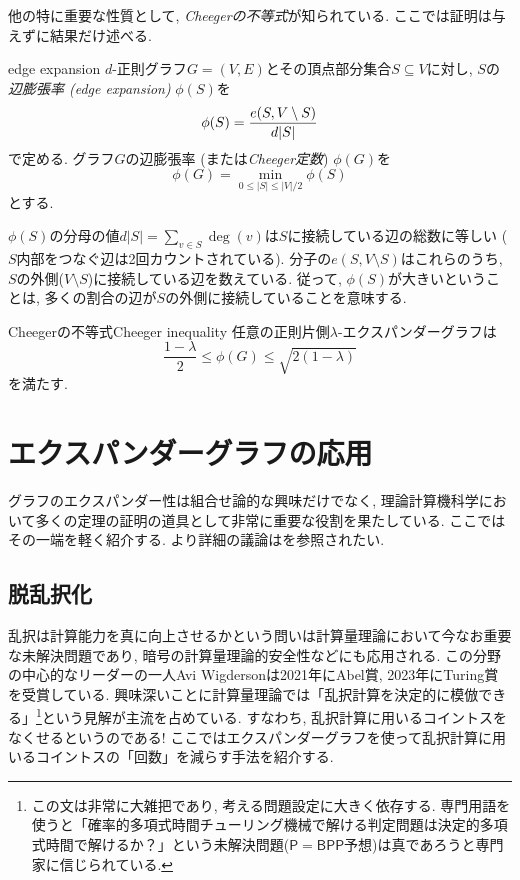 他の特に重要な性質として, \emph{Cheegerの不等式}\cite{Cheeger70}が知られている.
ここでは証明は与えずに結果だけ述べる.
%
\begin{definition}{}{edge expansion}
    $d$-正則グラフ$G=(V,E)$とその頂点部分集合$S\subseteq V$に対し,
    $S$の\emph{辺膨張率 (edge expansion)} $\phi(S)$を
    \[
        \phi(S) = \frac{e(S,V\setminus S)}{d\lvert S\rvert}
    \]
    で定める. グラフ$G$の辺膨張率 (または\emph{Cheeger定数}) $\phi(G)$を
    \[
        \phi(G) = \min_{0 \le |S| \le |V|/2} \phi(S)
    \]
    とする.
\end{definition}
$\phi(S)$の分母の値$d|S|  =\sum_{v\in S}\deg(v)$は$S$に接続している辺の総数に等しい ($S$内部をつなぐ辺は2回カウントされている).
分子の$e(S,V\setminus S)$はこれらのうち, $S$の外側($V\setminus S$)に接続している辺を数えている.
従って, $\phi(S)$が大きいということは, 多くの割合の辺が$S$の外側に接続していることを意味する.
\begin{theorem}{Cheegerの不等式}{Cheeger inequality}
    任意の正則片側$\lambda$-エクスパンダーグラフは
    \[
        \frac{1-\lambda}{2} \le \phi(G) \le \sqrt{2(1-\lambda)}
    \]
    を満たす.
\end{theorem}


\section{エクスパンダーグラフの応用} \label{sec:expander graph application}
グラフのエクスパンダー性は組合せ論的な興味だけでなく,
理論計算機科学において多くの定理の証明の道具として非常に重要な役割を果たしている.
ここではその一端を軽く紹介する.
より詳細の議論は\cite{HLW06}を参照されたい.
%
\subsection{脱乱択化}
乱択は計算能力を真に向上させるかという問いは計算量理論において今なお重要な未解決問題であり,
暗号の計算量理論的安全性などにも応用される.
この分野の中心的なリーダーの一人Avi Wigdersonは2021年にAbel賞, 2023年にTuring賞を受賞している.
興味深いことに計算量理論では「乱択計算を決定的に模倣できる」\footnote{この文は非常に大雑把であり, 考える問題設定に大きく依存する. 専門用語を使うと「確率的多項式時間チューリング機械で解ける判定問題は決定的多項式時間で解けるか？」という未解決問題($\mathsf{P}=\mathsf{BPP}$予想)は真であろうと専門家に信じられている.}という見解が主流を占めている.
すなわち, 乱択計算に用いるコイントスをなくせるというのである!
ここではエクスパンダーグラフを使って乱択計算に用いるコイントスの「回数」を減らす手法\cite{AKS87}を紹介する.

